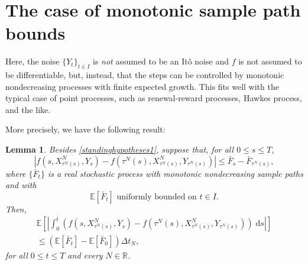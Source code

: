 \documentclass[reqno,12pt]{amsart}
\theoremstyle{plain}%
\newtheorem{lem}{Lemma}[section]
\theoremstyle{definition}
\begin{document}
\section{The case of monotonic sample path bounds}
\label{secmonotonicbound}

Here, the noise $\{Y_t\}_{t\in I}$ is \emph{not} assumed to be an It\^o noise and $f$ is not assumed to be differentiable, but, instead, that the steps can be controlled by monotonic nondecreasing processes with finite expected growth. This fits well with the typical case of point processes, such as renewal-reward processes, Hawkes process, and the like.

More precisely, we have the following result:

\begin{lem}
    \label{lemmonotonicbound}
    Besides \cref{standinghypotheses1}, suppose that, for all $0 \leq s \leq T$,
    \begin{equation}
        \label{stepbound}
          |f(s, X_{\tau^N(s)}^N, Y_s) - f({\tau^N(s)}, X_{\tau^N(s)}^N, Y_{\tau^N(s)})| \leq \bar F_s - \bar F_{\tau^N(s)},
      \end{equation}
      where $\{\bar F_t\}$ is a real stochastic process with monotonic nondecreasing sample paths and with
      \begin{equation}
        \label{expectstepmonotonic}
        \mathbb{E}[\bar F_t] \textrm{ uniformly bounded on } t\in I.
      \end{equation}
      Then,
      \begin{multline}
        \label{expectintfboundbyG}
          \mathbb{E}\left[\left|\int_0^t \left( f(s, X_{\tau^N(s)}^N, Y_s) - f(\tau^N(s), X_{\tau^N(s)}^N, Y_{\tau^N(s)}) \right)\;\mathrm{d}s\right|\right] \\
          \leq (\mathbb{E}[\bar F_t] - \mathbb{E}[\bar F_0])\Delta t_N,
      \end{multline}
      for all $0 \leq t \leq T$ and every $N\in \mathbb{R}$.
\end{lem}
\end{document}
